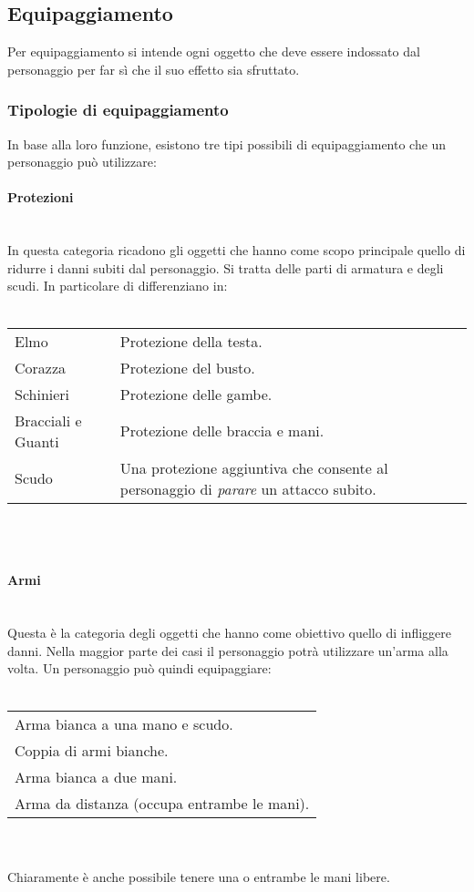 \documentclass[../manuale_main.tex]{subfiles}
\begin{document}
\subsection{Equipaggiamento}
Per equipaggiamento si intende ogni oggetto che deve essere indossato dal personaggio per far sì che il suo effetto sia sfruttato.
\subsubsection{Tipologie di equipaggiamento}
In base alla loro funzione, esistono tre tipi possibili di equipaggiamento che un personaggio può utilizzare:
\paragraph{Protezioni}\mbox{}\\
In questa categoria ricadono gli oggetti che hanno come scopo principale quello di ridurre i danni subiti dal personaggio. Si tratta delle parti di armatura e degli scudi.
In particolare di differenziano in:\\\mbox{}\\
\renewcommand{\arraystretch}{1.2}
\begin{tabular}{|l l|}
\hline
Elmo&Protezione della testa.\\
Corazza&Protezione del busto.\\
Schinieri&Protezione delle gambe.\\
Bracciali e Guanti&Protezione delle braccia e mani.\\
Scudo&Una protezione aggiuntiva che consente al personaggio di \emph{parare} un attacco subito.\\
\hline
\end{tabular}
\\\mbox{}\\
\paragraph{Armi}\mbox{}\\
Questa è la categoria degli oggetti che hanno come obiettivo quello di infliggere danni. Nella maggior parte dei casi il personaggio potrà utilizzare un'arma alla volta.
Un personaggio può quindi equipaggiare:\\\mbox{}\\
\begin{tabular}{|l|}
\hline
Arma bianca a una mano e scudo.\\
Coppia di armi bianche.\\
Arma bianca a due mani.\\
Arma da distanza (occupa entrambe le mani).\\
\hline
\end{tabular}\\\mbox{}\\
Chiaramente è anche possibile tenere una o entrambe le mani libere.
\end{document}

